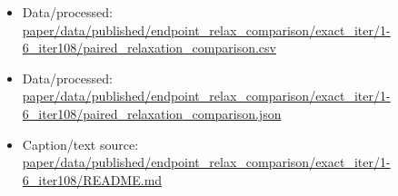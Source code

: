 \begin{itemize}[leftmargin=1.4em,noitemsep]
\item Data/processed: \begingroup\scriptsize\url{paper/data/published/endpoint_relax_comparison/exact_iter/1-6_iter108/paired_relaxation_comparison.csv}\endgroup
\item Data/processed: \begingroup\scriptsize\url{paper/data/published/endpoint_relax_comparison/exact_iter/1-6_iter108/paired_relaxation_comparison.json}\endgroup
\item Caption/text source: \begingroup\scriptsize\url{paper/data/published/endpoint_relax_comparison/exact_iter/1-6_iter108/README.md}\endgroup
\end{itemize}
